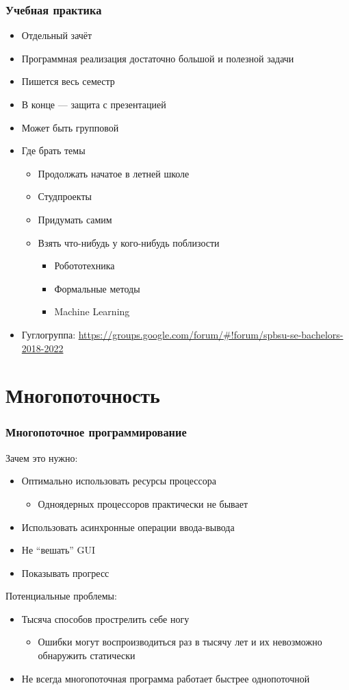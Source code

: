 \documentclass[xetex,mathserif,serif]{beamer}
\begin{document}
	\begin{frame}
		\frametitle{Учебная практика}
		\begin{itemize}
			\item Отдельный зачёт
			\item Программная реализация достаточно большой и полезной задачи
			\item Пишется весь семестр
			\item В конце --- защита с презентацией
			\item Может быть групповой
			\item Где брать темы
			\begin{itemize}
				\item Продолжать начатое в летней школе
				\item Студпроекты
				\item Придумать самим
				\item Взять что-нибудь у кого-нибудь поблизости
				\begin{itemize}
					\item Робототехника
					\item Формальные методы
					\item Machine Learning
				\end{itemize}
			\end{itemize}
			\item Гуглогруппа: \url{https://groups.google.com/forum/\#!forum/spbsu-se-bachelors-2018-2022}
		\end{itemize}
	\end{frame}

	\section{Многопоточность}

	\begin{frame}
		\frametitle{Многопоточное программирование}
		Зачем это нужно:
		\begin{itemize}
			\item Оптимально использовать ресурсы процессора
			\begin{itemize}
				\item Одноядерных процессоров практически не бывает
			\end{itemize}
			\item Использовать асинхронные операции ввода-вывода
			\item Не ``вешать'' GUI
			\item Показывать прогресс
		\end{itemize}
		\vspace{5mm}
		Потенциальные проблемы:
		\begin{itemize}
			\item Тысяча способов прострелить себе ногу
			\begin{itemize}
				\item Ошибки могут воспроизводиться раз в тысячу лет и их невозможно обнаружить статически
			\end{itemize}
			\item Не всегда многопоточная программа работает быстрее однопоточной
		\end{itemize}
	\end{frame}
\end{document}
